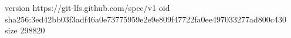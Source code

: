 version https://git-lfs.github.com/spec/v1
oid sha256:3ed42bb03f3adf46a0e73775959e2e9e809f47722fa0ee497033277ad800c430
size 298820
